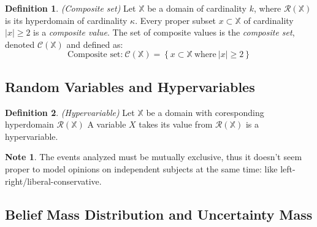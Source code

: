 \documentclass[a4paper,12pt]{article}
\theoremstyle{definition}
\newtheorem{definition}{Definition}[section]
\newtheorem{note}{Note}[section]
\numberwithin{equation}{section}
\begin{document}
\begin{definition}
	\emph{(Composite set)} Let $\mathbb{X}$ be a domain of cardinality $k$, where $\mathcal{R}(\mathbb{X})$ is its hyperdomain of cardinality $\kappa$. Every proper subset $x \subset \mathbb{X}$ of cardinality $\left|x\right| \geq 2$ is a \emph{composite value}. The set of composite values is the \emph{composite set}, denoted $\mathcal{C}(\mathbb{X})$ and defined as:
	\begin{equation}
		\text{Composite set:}\ \mathcal{C}(\mathbb{X}) = \left\{x \subset \mathbb{X}\ \text{where}\ \left|x\right| \geq 2\right\}
	\end{equation}
\end{definition}

\subsection{Random Variables and Hypervariables}

\begin{definition}
	\emph{(Hypervariable)} Let $\mathbb{X}$ be a domain with coresponding hyperdomain $\mathcal{R}(\mathbb{X})$ A variable $X$ takes its value from $\mathcal{R}(\mathbb{X})$ is a hypervariable.
\end{definition}

\begin{note}
	The events analyzed must be mutually exclusive, thus it doesn't seem proper to model opinions on independent subjects at the same time: like left-right/liberal-conservative.
\end{note}

\subsection{Belief Mass Distribution and Uncertainty Mass}
\end{document}

